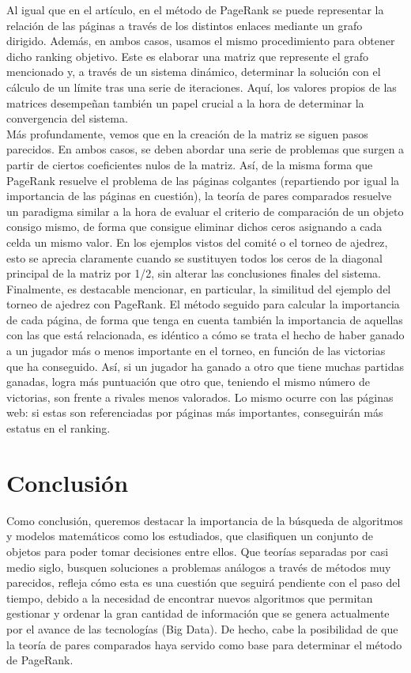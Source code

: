 \documentclass[a4paper]{article}
\begin{document}
Al igual que en el artículo, en el método de PageRank se puede representar la relación de las páginas a través de los distintos enlaces mediante un grafo dirigido. Además, en ambos casos, usamos el mismo procedimiento para obtener dicho ranking objetivo. Este es elaborar una matriz que represente el grafo mencionado y, a través de un sistema dinámico, determinar la solución con el cálculo de un límite tras una serie de iteraciones. Aquí, los valores propios de las matrices desempeñan también un papel crucial a la hora de determinar la convergencia del sistema.\\


Más profundamente, vemos que en la creación de la matriz se siguen pasos parecidos. En ambos casos, se deben abordar una serie de problemas que surgen a partir de ciertos coeficientes nulos de la matriz. Así, de la misma forma que PageRank resuelve el problema de las páginas colgantes (repartiendo por igual la importancia de las páginas en cuestión), la teoría de pares comparados resuelve un paradigma similar a la hora de evaluar el criterio de comparación de un objeto consigo mismo, de forma que consigue eliminar dichos ceros asignando a cada celda un mismo valor. En los ejemplos vistos del comité o el torneo de ajedrez, esto se aprecia claramente cuando se sustituyen todos los ceros de la diagonal principal de la matriz por 1/2, sin alterar las conclusiones finales del sistema.\\


Finalmente, es destacable mencionar, en particular, la similitud del ejemplo del torneo de ajedrez con PageRank. El método seguido para calcular la importancia de cada página, de forma que tenga en cuenta también la importancia de aquellas con las que está relacionada, es idéntico a cómo se trata el hecho de haber ganado a un jugador más o menos importante en el torneo, en función de las victorias que ha conseguido. Así, si un jugador ha ganado a otro que tiene muchas partidas ganadas, logra más puntuación que otro que, teniendo el mismo número de victorias, son frente a rivales menos valorados. Lo mismo ocurre con las páginas web: si estas son referenciadas por páginas más importantes, conseguirán más estatus en el ranking.\\


\section{Conclusión}
Como conclusión, queremos destacar la importancia de la búsqueda de algoritmos y modelos matemáticos como los estudiados, que clasifiquen un conjunto de objetos para poder tomar decisiones entre ellos. Que teorías separadas por casi medio siglo, busquen soluciones a problemas análogos a través de métodos muy parecidos, refleja cómo esta es una cuestión que seguirá pendiente con el paso del tiempo, debido a la necesidad de encontrar nuevos algoritmos que permitan gestionar y ordenar la gran cantidad de información que se genera actualmente por el avance de las tecnologías (Big Data). De hecho, cabe la posibilidad de que la teoría de pares comparados haya servido como base para determinar el método de PageRank.\\
\end{document}
